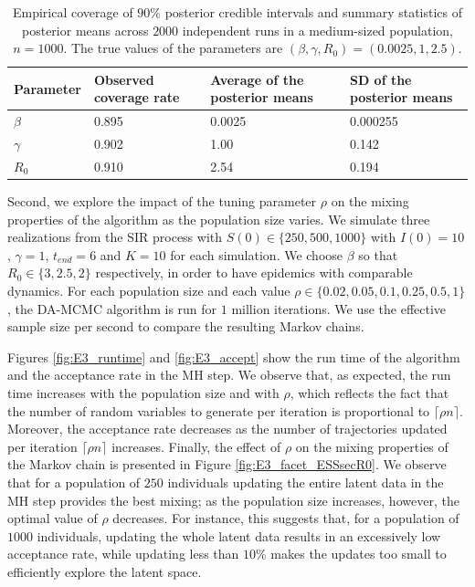\documentclass[12pt]{article}
\begin{document}
	
	\begin{table}
		\caption{Empirical coverage of $90\%$ posterior credible intervals and summary statistics of posterior means across $2000$ independent runs in a medium-sized population, $n=1000$. The true values of the parameters are $(\beta, \gamma, R_0) = (0.0025, 1, 2.5)$. %
			\label{tab:coverage}}
		\begin{center}
			\begin{tabular}{ C{2cm}| *{3}{C{3cm}}}
				Parameter & Observed coverage rate & Average of the posterior means & SD of the posterior means \\ 
				\hline
				$\beta$ & 0.895 & 0.0025 & 0.000255 \\ 
				$\gamma$ & 0.902 & 1.00 & 0.142 \\ 
				$R_0$ & 0.910 & 2.54 & 0.194 \\
				\hline
			\end{tabular}
		\end{center}
	\end{table}
	
	Second, we explore the impact of the tuning parameter $\rho$ on the mixing properties of the algorithm as the population size varies.
	We simulate three realizations from the SIR process with $S(0) \in \{250, 500, 1000\}$ with  $I(0)=10$, $\gamma=1$, $t_{end} = 6$ and $K = 10$ for each simulation. We choose $\beta$ so that $R_0 \in \{3, 2.5, 2\}$ respectively, in order to have epidemics with comparable dynamics. For each population size and each value $\rho \in \{0.02, 0.05, 0.1, 0.25, 0.5, 1\}$, the DA-MCMC algorithm is run for $1$ million iterations. We use the effective sample size per second to compare the resulting Markov chains.
	
	Figures \ref{fig:E3_runtime} and \ref{fig:E3_accept} show the run time of the algorithm and the acceptance rate in the MH step. We observe that, as expected, the run time increases with the population size and with $\rho$, which reflects the fact that the number of random variables to generate per iteration is proportional to $\lceil\rho n\rceil$. Moreover, the acceptance rate decreases as the number of trajectories updated per iteration $\lceil\rho n\rceil$ increases.
	Finally, the effect of $\rho$ on the mixing properties of the Markov chain is presented in Figure \ref{fig:E3_facet_ESSsecR0}. We observe that for a population of $250$ individuals updating the entire latent data in the MH step provides the best mixing; as the population size increases, however, the optimal value of $\rho$ decreases. For instance, this suggests that, for a population of $1000$ individuals, updating the whole latent data results in an excessively low acceptance rate, while updating less than $10$\% makes the updates too small to efficiently explore the latent space.
	
\end{document}
